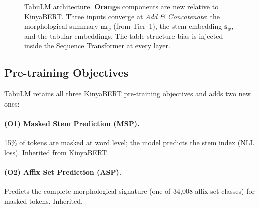 \documentclass[11pt]{article}
\begin{document}
\begin{figure}[t]
\caption{TabuLM architecture. \textcolor{orange!80!black}{\textbf{Orange}} components are new relative to KinyaBERT. Three inputs converge at \emph{Add \& Concatenate}: the morphological summary $\mathbf{m}_w$ (from Tier~1), the stem embedding $\mathbf{s}_w$, and the tabular embeddings. The table-structure bias is injected inside the Sequence Transformer at every layer.}
\label{fig:architecture}
\end{figure}

\subsection{Pre-training Objectives}
\label{sec:objectives}

TabuLM retains all three KinyaBERT pre-training objectives and adds two new ones:

\paragraph{(O1) Masked Stem Prediction (MSP).}
15\% of tokens are masked at word level; the model predicts the stem index (NLL loss). Inherited from KinyaBERT.

\paragraph{(O2) Affix Set Prediction (ASP).}
Predicts the complete morphological signature (one of 34,008 affix-set classes) for masked tokens. Inherited.
\end{document}
